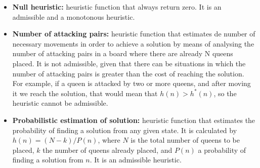 \documentclass[]{llncs}
\begin{document}
\begin{itemize}
    \item \textbf{Null heuristic:} heuristic function that always return zero. It is an admissible and a monotonous heuristic.  
    \item \textbf{Number of attacking pairs:} heuristic function that estimates de number of necessary movements in order to achieve a solution by means of analysing the number of attacking pairs in a board where there are already N queens placed. It is not admissible, given that there can be situations in which the number of attacking pairs is greater than the cost of reaching the solution. For example, if a queen is attacked by two or more queens, and after moving it we reach the solution, that would mean that $h(n) > h^{*}(n)$, so the heuristic cannot be admissible. 
    \item \textbf{Probabilistic estimation of solution:} heuristic function that estimates the probability of finding a solution from any given state. It is calculated by $h(n) = (N-k) / P(n)$, where $N$ is the total number of queens to be placed, $k$ the number of queens already placed, and $P(n)$ a probability of finding a solution from $n$. It is an admissible heuristic. 
\end{itemize}
\end{document}

